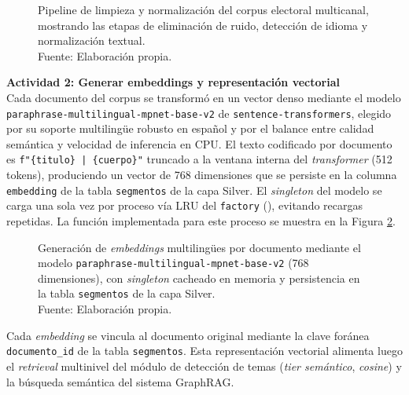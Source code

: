 \begin{figure}[!ht]
    \begin{center}
        \resizebox{0.38\textwidth}{!}{}
        \caption[Pipeline de limpieza y normalización del corpus electoral multicanal]{Pipeline de limpieza y normalización del corpus electoral multicanal, mostrando las etapas de eliminación de ruido, detección de idioma y normalización textual.\\Fuente: Elaboración propia.}
        \label{5:fig12}
    \end{center}
\end{figure}

\textbf{Actividad 2: Generar embeddings y representación vectorial}
\\
Cada documento del corpus se transformó en un vector denso mediante el modelo
\texttt{paraphrase-multilingual-mpnet-base-v2} de \texttt{sentence-transformers},
elegido por su soporte multilingüe robusto en español y por el balance entre
calidad semántica y velocidad de inferencia en CPU. El texto codificado por
documento es \texttt{f"\{titulo\} | \{cuerpo\}"} truncado a la ventana interna del
\textit{transformer} (512 tokens), produciendo un vector de 768 dimensiones que se
persiste en la columna \texttt{embedding} de la tabla \texttt{segmentos} de la capa
Silver. El \textit{singleton} del modelo se carga una sola vez por proceso vía LRU
del \texttt{factory}
(), evitando recargas repetidas. La
función implementada para este proceso se muestra en la Figura \ref{5:fig14}.

\begin{figure}[!ht]
    \begin{center}
        \resizebox{0.85\textwidth}{!}{}
        \caption[Generación de embeddings multilingües con sentence-transformers]{Generación de \textit{embeddings} multilingües por documento mediante el modelo \texttt{paraphrase-multilingual-mpnet-base-v2} (768 dimensiones), con \textit{singleton} cacheado en memoria y persistencia en la tabla \texttt{segmentos} de la capa Silver.\\
            Fuente: Elaboración propia.}
        \label{5:fig14}
    \end{center}
\end{figure}

Cada \textit{embedding} se vincula al documento original mediante la clave
foránea \texttt{documento\_id} de la tabla \texttt{segmentos}. Esta representación
vectorial alimenta luego el \textit{retrieval} multinivel del módulo de detección
de temas (\textit{tier semántico}, \textit{cosine}) y la búsqueda semántica del
sistema GraphRAG.

